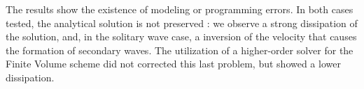 \indent The results show the existence of modeling or programming errors. In both cases tested, the analytical solution is not preserved : we observe a strong dissipation of the solution, and, in the solitary wave case, a inversion of the velocity that causes the formation of secondary waves. The utilization of a higher-order solver for the Finite Volume scheme did not corrected this last problem, but showed a lower dissipation.